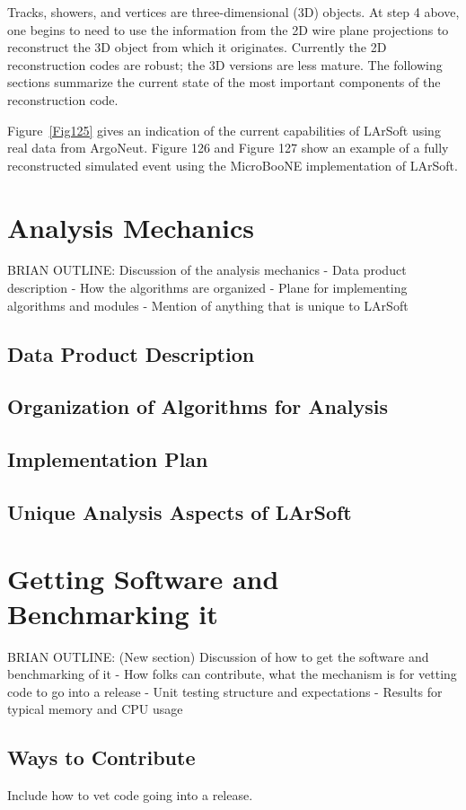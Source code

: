 \documentclass[12pt]{elsarticle}
\begin{document}
Tracks, showers, and vertices are three-dimensional (3D) objects. At step 4 above, one begins to need to use the information from the 2D wire plane projections to reconstruct the 3D object from which it originates. Currently the 2D reconstruction codes are robust; the 3D versions are less mature. The following sections summarize the current state of the most important components of the reconstruction code.


Figure~\ref{Fig125} gives an indication of the current capabilities of LArSoft using real data from ArgoNeut. Figure 126 and Figure 127 show an example of a fully reconstructed simulated event using the MicroBooNE implementation of LArSoft.

               
\section{Analysis Mechanics}

BRIAN OUTLINE: Discussion of the analysis mechanics
- Data product description
- How the algorithms are organized
- Plane for implementing algorithms and modules
- Mention of anything that is unique to LArSoft 
\subsection{Data Product Description}
\subsection{Organization of Algorithms for Analysis}
\subsection{Implementation Plan}
\subsection{Unique Analysis Aspects of LArSoft}

\section{Getting Software and Benchmarking it}

BRIAN OUTLINE: (New section) Discussion of how to get the software and benchmarking of it
- How folks can contribute, what the mechanism is for vetting code to go into a release
- Unit testing structure and expectations
- Results for typical memory and CPU usage
\subsection{Ways to Contribute}
Include how to vet code going into a release.
\end{document}
